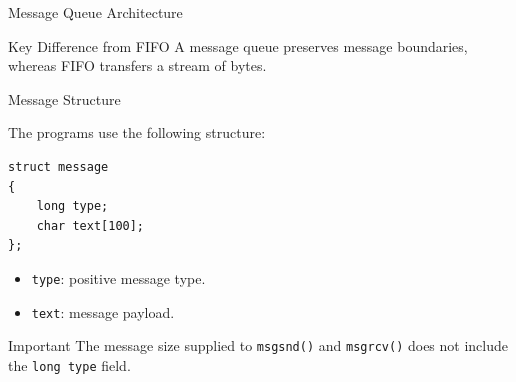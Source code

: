 \documentclass[aspectratio=169,10pt]{beamer}
\begin{document}
\begin{frame}{Message Queue Architecture}

\begin{center}
\end{center}

\vspace{0.4cm}

\begin{block}{Key Difference from FIFO}
A message queue preserves message boundaries,
whereas FIFO transfers a stream of bytes.
\end{block}

\end{frame}

\begin{frame}[fragile]{Message Structure}

The programs use the following structure:

\begin{lstlisting}[style=cstyle]
struct message
{
    long type;
    char text[100];
};
\end{lstlisting}

\begin{itemize}
    \item \texttt{type}: positive message type.
    \item \texttt{text}: message payload.
\end{itemize}

\begin{block}{Important}
The message size supplied to
\texttt{msgsnd()} and \texttt{msgrcv()}
does not include the \texttt{long type} field.
\end{block}

\end{frame}
\end{document}
